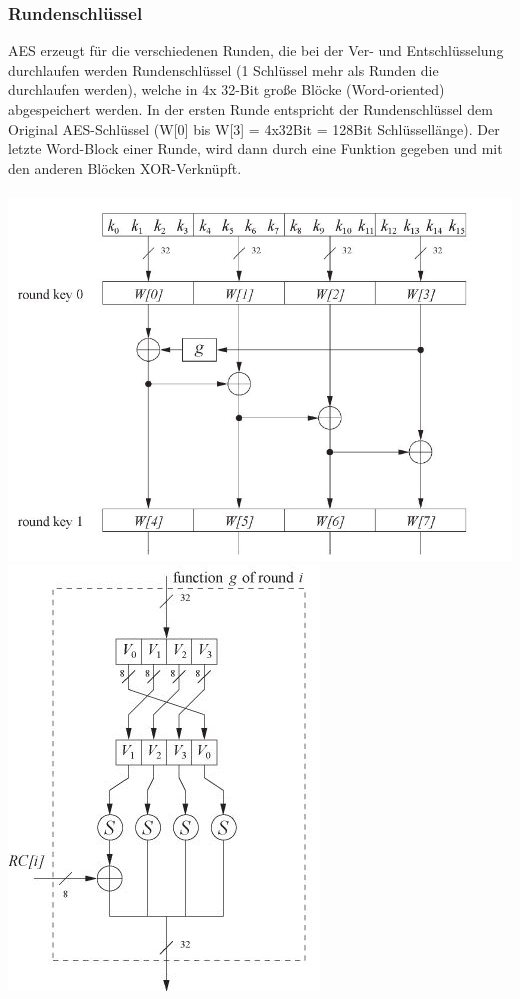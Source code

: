 \documentclass[10pt, a4paper,headsepline]{scrreprt}
\begin{document}
\subsubsection{Rundenschlüssel}
AES erzeugt für die verschiedenen Runden, die bei der Ver- und Entschlüsselung durchlaufen werden Rundenschlüssel (1 Schlüssel mehr als Runden die durchlaufen werden), welche in 4x 32-Bit große Blöcke (Word-oriented) abgespeichert werden. In der ersten Runde entspricht der Rundenschlüssel dem Original AES-Schlüssel (W[0] bis W[3] = 4x32Bit = 128Bit Schlüssellänge). Der letzte Word-Block einer Runde, wird dann durch eine Funktion gegeben und mit den anderen Blöcken XOR-Verknüpft. \\ \\
\includegraphics[scale=0.5]{key_sched_1_round.JPG} 
\includegraphics[scale=0.5]{aes_key_sched_function_g.JPG} \\
\end{document}
